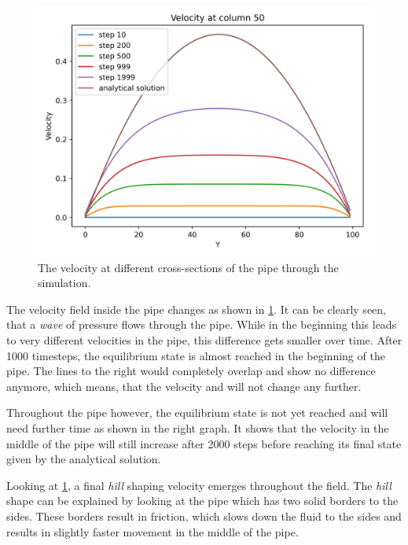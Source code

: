 \begin{figure}[H]
\begin{minipage}{0.33\textwidth}
        \includegraphics[width=\linewidth]{graphs/PoiseuilleFlow/velocity_for_step_at_columns_analytical}
    \end{minipage}
    \caption{
        The velocity at different cross-sections of the pipe through the simulation.
    }
    \label{fig:pf-velocity-areas}
\end{figure}

The velocity field inside the pipe changes as shown in \cref{fig:pf-velocity-areas}.
It can be clearly seen, that a \textit{wave} of pressure flows through the pipe.
While in the beginning this leads to very different velocities in the pipe, this difference gets smaller over time.
After 1000 timesteps, the equilibrium state is almost reached in the beginning of the pipe.
The lines to the right would completely overlap and show no difference anymore, which means, that the velocity and will not change any further.

Throughout the pipe however, the equilibrium state is not yet reached and will need further time as shown in the right graph.
It shows that the velocity in the middle of the pipe will still increase after 2000 steps before reaching its final state given by the analytical solution.
\newline

Looking at \cref{fig:pf-velocity-areas}, a final \textit{hill} shaping velocity emerges throughout the field.
The \textit{hill} shape can be explained by looking at the pipe which has two solid borders to the sides.
These borders result in friction, which slows down the fluid to the sides and results in slightly faster movement in the middle of the pipe.

